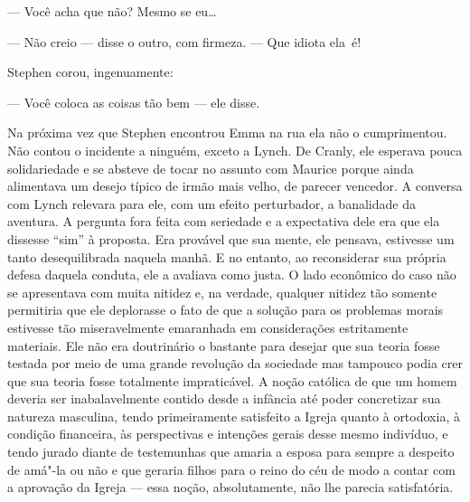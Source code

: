 --- Você acha que não?  Mesmo se eu\ldots{}

--- Não creio --- disse o outro, com firmeza.  --- Que idiota \mbox{ela é!}

Stephen corou, ingenuamente:

--- Você coloca as coisas tão bem --- ele disse.

Na próxima vez que Stephen encontrou Emma na rua ela não o
cumprimentou.  Não contou o incidente a ninguém, exceto a Lynch.  De
Cranly, ele esperava pouca solidariedade e se absteve de tocar no
assunto com Maurice porque ainda alimentava um desejo típico de irmão
mais velho, de parecer vencedor.  A conversa com Lynch relevara para
ele, com um efeito perturbador, a banalidade da aventura.  A pergunta
fora feita com seriedade e a expectativa dele era que ela dissesse
“sim” à proposta.  Era provável que sua mente, ele pensava, estivesse
um tanto desequilibrada naquela manhã.  E no entanto, ao reconsiderar
sua própria defesa daquela conduta, ele a avaliava como justa.  O lado
econômico do caso não se apresentava com muita nitidez e, na verdade,
qualquer nitidez tão somente permitiria que ele deplorasse o fato de
que a solução para os problemas morais estivesse tão miseravelmente
emaranhada em considerações estritamente materiais.  Ele não era
doutrinário o bastante para desejar que sua teoria fosse testada por
meio de uma grande revolução da sociedade mas tampouco podia
crer que sua teoria fosse totalmente impraticável.  A noção católica de
que um homem deveria ser inabalavelmente contido desde a infância até
poder concretizar sua natureza masculina, tendo primeiramente
satisfeito a Igreja quanto à ortodoxia, à condição financeira, às
perspectivas e intenções gerais desse mesmo indivíduo, e tendo jurado
diante de testemunhas que amaria a esposa para sempre a despeito de
amá"-la ou não e que geraria filhos para o reino do céu de modo a contar
com a aprovação da Igreja --- essa noção, absolutamente, não lhe
parecia satisfatória.

